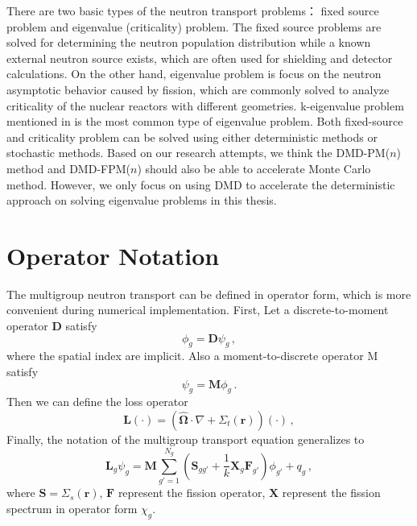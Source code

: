 There are two basic types of the neutron transport problems： fixed source problem and eigenvalue (criticality) problem.  
The fixed source problems are solved for determining the neutron population distribution while a known external neutron source exists, which are often used for shielding and detector calculations.
On the other hand, eigenvalue problem is focus on the neutron asymptotic behavior caused by fission, which are commonly solved to analyze criticality of the nuclear reactors with different geometries.
k-eigenvalue problem mentioned in  is the most common type of eigenvalue problem.
Both fixed-source and criticality problem can be solved using either deterministic methods or stochastic methods.
Based on our research attempts, we think the DMD-PM($n$) method and DMD-FPM($n$) should also be able to accelerate Monte Carlo method. 
However, we only focus on using DMD to accelerate the deterministic approach on solving eigenvalue problems in this thesis.

\section{Operator Notation}
The multigroup neutron transport  can be defined in operator form, which is more convenient during numerical implementation. First, Let a discrete-to-moment operator $\mathbf{D}$ satisfy
\begin{equation}
 \phi_g = \mathbf{D} \psi_g  \, ,
 \label{eq:operatorD}
\end{equation}
where the spatial index are implicit. Also a moment-to-discrete operator M satisfy 
\begin{equation}
 \psi_g = \mathbf{M} \phi_g  \, .
 \label{eq:operatorM}
\end{equation}
Then we can define the loss operator 
\begin{equation}
 \mathbf{L}(\cdot) = (\bm{\hat{\Omega}} \cdot \nabla + \Sigma_t(\mathbf{r}))(\cdot) \, ,
 \label{eq:operatorL}
\end{equation}
Finally, the notation of the multigroup transport equation generalizes to \cite{slaybaugh_multigrid_2013}
\begin{equation}
\mathbf{L}_g \psi_g = \mathbf{M} \sum\limits^{N_g}_{g'=1} (\mathbf{S}_{gg'} + \frac{1}{k} \mathbf{X}_g \mathbf{F}_{g'}) \phi_{g'} +q_g   \, ,
 \label{eq:operator_transport}
\end{equation}
where $\mathbf{S} = \Sigma_s(\mathbf{r})$, $\mathbf{F}$ represent the fission operator, $\mathbf{X}$ represent the fission spectrum in operator form $\chi_g$. 

